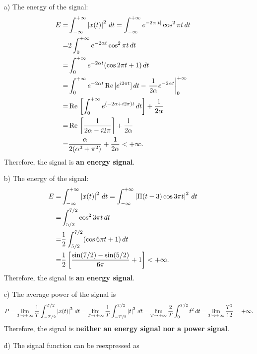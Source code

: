 \documentclass{assignment}
\begin{document}
\begin{sol}
    \begin{itemize}
        \item[a)] The energy of the signal:
        \begin{align}
            \notag E=&\int_{-\infty}^{+\infty}\left\lvert x(t)\right\rvert^2\,dt=\int_{-\infty}^{+\infty}e^{-2\alpha\left\lvert t\right\rvert}\cos^2\pi t\,dt\\
            \notag=&2\int_0^{+\infty}e^{-2\alpha t}\cos^2\pi t\,dt\\
            \notag=&\int_0^{+\infty}e^{-2\alpha t}(\cos 2\pi t+1)\,dt\\
            \notag=&\int_0^{+\infty}e^{-2\alpha t}\,\text{Re}\,[e^{i2\pi t}]\,dt-\left.\frac{1}{2\alpha}e^{-2\alpha t}\right\lvert_{0}^{+\infty}\\
            \notag=&\,\text{Re}\,\left[\int_0^{+\infty}e^{(-2\alpha+i2\pi)t}\,dt\right]+\frac{1}{2\alpha}\\
            \notag=&\,\text{Re}\,\left[\frac{1}{2\alpha-i2\pi}\right]+\frac{1}{2\alpha}\\
            =&\frac{\alpha}{2(\alpha^2+\pi^2)}+\frac{1}{2\alpha}<+\infty.
        \end{align}
        Therefore, the signal is \textbf{an energy signal}.
        \item[b)] The energy of the signal:
        \begin{align}
            \notag E=&\int_{-\infty}^{+\infty}\left\lvert x(t)\right\rvert^2\,dt=\int_{-\infty}^{+\infty}\left\lvert\Pi(t-3)\cos 3\pi t\right\rvert^2\,dt\\
            \notag=&\int_{5/2}^{7/2}\cos^23\pi t\,dt\\
            \notag=&\frac{1}{2}\int_{5/2}^{7/2}(\cos 6\pi t+1)\,dt\\
            \notag=&\frac{1}{2}\left[\frac{\sin(7/2)-\sin(5/2)}{6\pi}+1\right]<+\infty.
        \end{align}
        Therefore, the signal is \textbf{an energy signal}.
        \item[c)] The average power of the signal is
        \begin{align}
            P=\lim_{T\rightarrow+\infty}\frac{1}{T}\int_{-T/2}^{T/2}\left\lvert x(t)\right\rvert^2\,dt=\lim_{T\rightarrow+\infty}\frac{1}{T}\int_{-T/2}^{T/2}\left\lvert t\right\rvert^2\,dt=\lim_{T\rightarrow+\infty}\frac{2}{T}\int_0^{T/2}t^2\,dt=\lim_{T\rightarrow+\infty}\frac{T^2}{12}=+\infty.
        \end{align}
        Therefore, the signal is \textbf{neither an energy signal nor a power signal}.
        \item[d)] The signal function can be reexpressed as

\end{itemize}
\end{sol}
\end{document}
